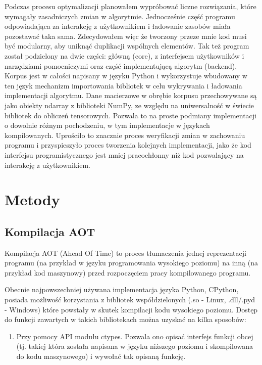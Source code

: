 \documentclass[11pt, a4paper]{article}
\begin{document}
\begin{sloppypar}
    Podczas procesu optymalizacji planowałem wypróbować liczne rozwiązania, które wymagały
    zasadniczych zmian w algorytmie. Jednocześnie część programu odpowiadająca za
    interakcję z użytkownikiem i ładowanie zasobów miała pozostawać taka sama. Zdecydowałem
    więc że tworzony przeze mnie kod musi być modularny, aby uniknąć duplikacji
    wspólnych elementów. Tak też program został podzielony na dwie części: główną (core),
    z interfejsem użytkowników i narzędziami pomocniczymi oraz część implementującą algorytm
    (backend). Korpus jest w całości napisany w języku Python i wykorzystuje wbudowany w
    ten język mechanizm importowania bibliotek w celu wykrywania i ładowania
    implementacji algorytmu. Dane macierzowe w obrębie korpusu przechowywane są jako obiekty
    ndarray z biblioteki NumPy, ze względu na uniwersalność w świecie bibliotek do
    obliczeń tensorowych. Pozwala to na proste podmiany implementacji o dowolnie różnym pochodzeniu,
    w tym implementacje w językach kompilowanych. Uprościło to znacznie proces weryfikacji
    zmian w zachowaniu programu i przyspieszyło proces tworzenia kolejnych implementacji,
    jako że kod interfejsu programistycznego jest mniej pracochłonny niż kod pozwalający
    na interakcję z użytkownikiem.
    \newpage


    \section{Metody}


    \subsection{Kompilacja AOT}


    Kompilacja AOT (Ahead Of Time) to proces tłumaczenia jednej reprezentacji programu (na
    przykład w języku programowania wysokiego poziomu) na inną (na przykład kod
    maszynowy) przed rozpoczęciem pracy kompilowanego programu.

    Obecnie najpowszechniej używana implementacja języka Python, CPython, posiada możliwość
    korzystania z bibliotek współdzielonych (.so - Linux, .dll/.pyd - Windows) które powstały
    w skutek kompilacji kodu wysokiego poziomu. Dostęp do funkcji zawartych w takich
    bibliotekach można uzyskać na kilka sposobów:

    \begin{enumerate}
      \item Przy pomocy API modułu ctypes\cite{Python_ctypes}. Pozwala ono opisać interfejs
        funkcji obcej (tj. takiej która została napisana w języku niższego poziomu i skompilowana
        do kodu maszynowego) i wywołać tak opisaną funkcję.


\end{enumerate}
\end{sloppypar}
\end{document}
